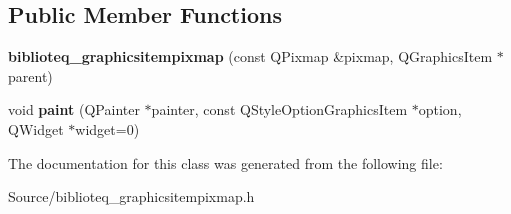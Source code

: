 \subsection*{Public Member Functions}
\begin{DoxyCompactItemize}
\item 
{\bfseries biblioteq\+\_\+graphicsitempixmap} (const Q\+Pixmap \&pixmap, Q\+Graphics\+Item $\ast$parent)\hypertarget{classbiblioteq__graphicsitempixmap_a32d4d2f606c7043c500ba174bcea710b}{}\label{classbiblioteq__graphicsitempixmap_a32d4d2f606c7043c500ba174bcea710b}

\item 
void {\bfseries paint} (Q\+Painter $\ast$painter, const Q\+Style\+Option\+Graphics\+Item $\ast$option, Q\+Widget $\ast$widget=0)\hypertarget{classbiblioteq__graphicsitempixmap_a4518dd486c216bf46888ee6a91301067}{}\label{classbiblioteq__graphicsitempixmap_a4518dd486c216bf46888ee6a91301067}

\end{DoxyCompactItemize}


The documentation for this class was generated from the following file\+:\begin{DoxyCompactItemize}
\item 
Source/biblioteq\+\_\+graphicsitempixmap.\+h\end{DoxyCompactItemize}
